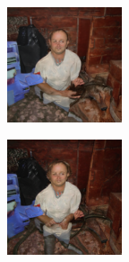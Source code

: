 \documentclass{article}
\begin{document}
\begin{figure}
\begin{subfigure}[b]{0.5\linewidth}
\begin{subfigure}[b]{0.242\linewidth}
        \end{subfigure}
        \begin{subfigure}[b]{0.242\linewidth}
        \includegraphics[width=\linewidth]{figures/imagenet128/solver_samples/imagenet128_fm_ot_53_20.png}
        \end{subfigure}
        \begin{subfigure}[b]{0.242\linewidth}
        \includegraphics[width=\linewidth]{figures/imagenet128/solver_samples/imagenet128_fm_ot_53_50.png}
        \end{subfigure}
    \end{subfigure}\\
    

\end{figure}
\end{document}
